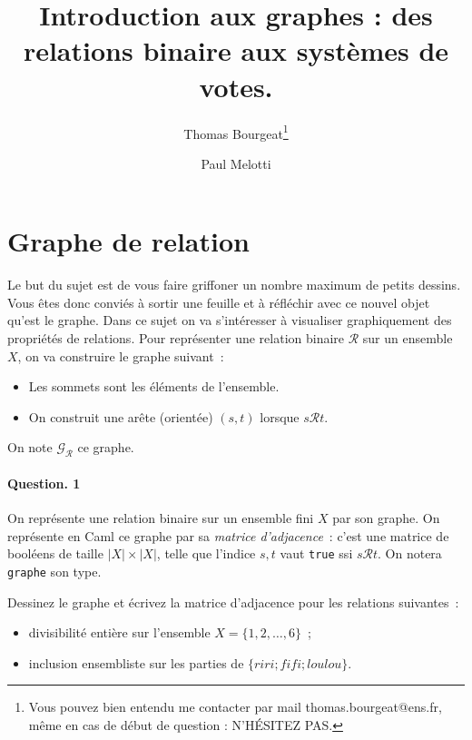 \documentclass[10pt,a4paper]{article}
\begin{document}
\title{Introduction aux graphes : des relations binaire aux systèmes de votes.}
\author{Thomas Bourgeat\footnote{Vous pouvez bien entendu me contacter par mail thomas.bourgeat@ens.fr, même en cas de début de question : N'HÉSITEZ PAS.}\and Paul Melotti}
\maketitle{}

\section{Graphe de relation}

Le but du sujet est de vous faire griffoner un nombre maximum de petits
dessins. Vous êtes donc conviés à sortir une feuille et à réfléchir avec
ce nouvel objet qu'est le graphe. 
Dans ce sujet on va s'intéresser à visualiser graphiquement des
propriétés de relations. Pour représenter une relation binaire $\mathcal{R}$ sur un ensemble
$X$, on va construire le graphe suivant~: 
\begin{itemize}
\item Les sommets sont les éléments de l'ensemble.
\item On construit une arête (orientée) $(s,t)$ lorsque $s \mathcal{R} t$.
\end{itemize}
On note $\mathcal{G}_{\mathcal{R}}$ ce graphe.
\paragraph{Question. 1\\}
On représente une relation binaire sur un ensemble fini $X$ par son graphe.
On représente en Caml ce graphe par sa
\textit{matrice d'adjacence}~: c'est une matrice de booléens de taille 
$|X| \times |X|$, telle que l'indice $s,t$ vaut \texttt{true} ssi 
$s\mathcal{R} t$. On notera \texttt{graphe} son type.

Dessinez le graphe et écrivez la matrice d'adjacence pour les relations 
suivantes~:
\begin{itemize}
\item divisibilité entière sur l'ensemble $X=\{1,2,\dots,6\}$~;
\item inclusion ensembliste sur les parties de $\{riri;fifi;loulou\}$.
\end{itemize}
\end{document}
